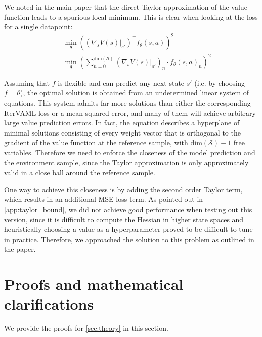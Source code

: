 We noted in the main paper that the direct Taylor approximation of the value function leads to a spurious local minimum. This is clear when looking at the loss for a single datapoint:
\begin{align*}
    &\min_\theta \left((\nabla_s V(s)|_{s'})^\intercal f_\theta(s,a) \right) ^2\\
    =&\min_\theta \left(\sum_{n=0}^{\text{dim}(\mathcal{S})} (\nabla_s V(s)|_{s'})_n \cdot f_\theta(s,a)_n\right)^2
\end{align*}

Assuming that $f$ is flexible and can predict any next state $s'$ (i.e. by choosing $f=\theta$), the optimal solution is obtained from an undetermined linear system of equations.
This system admits far more solutions than either the corresponding IterVAML loss or a mean squared error, and many of them will achieve arbitrary large value prediction errors. In fact, the equation describes a hyperplane of minimal solutions consisting of every weight vector that is orthogonal to the gradient of the value function at the reference sample, with $\text{dim}(\mathcal{S}) - 1$ free variables. Therefore we need to enforce the closeness of the model prediction and the environment sample, since the Taylor approximation is only approximately valid in a close ball around the reference sample.

One way to achieve this closeness is by adding the second order Taylor term, which results in an additional MSE loss term.
As pointed out in \autoref{app:taylor_bound}, we did not achieve good performance when testing out this version, since it is difficult to compute the Hessian in higher state spaces and heuristically choosing a value as a hyperparameter proved to be difficult to tune in practice.
Therefore, we approached the solution to this problem as outlined in the paper.

\section{Proofs and mathematical clarifications}
\label{app:proofs}

We provide the proofs for \autoref{sec:theory} in this section.


\newcommand{\mx}[1]{\hat{x}^{(#1)}_i}
\newcommand{\px}[1]{x^{(#1)}_i}
\newcommand{\TrV}{\squareb{r\roundb{x^{(1)}_i} + \gamma V'\roundb{x^{(2)}_{i}} }}
\newcommand{\TrVc}{\squareb{r\roundb{x^{(1)}_i} + \gamma \hat{V}\roundb{x^{(2)}_{i}} }}
\newcommand{\TrVp}{\squareb{r\roundb{x^{(1)}_i} + \gamma V\roundb{x^{(2)}_{i}} }}
\newcommand{\Vest}{V_{\text{est}}\roundb{\px{1},\px{2}}}
\setcounter{proposition}{0}

